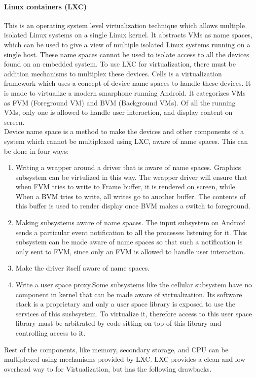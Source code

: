 \documentclass[seminar,twoside]{iitbreport}
\begin{document}
  \paragraph{Linux containers (LXC)}
  This is an operating system level virtualization technique which allows multiple isolated Linux systems on a single Linux kernel. It abstracts VMs as name spaces, which
  can be used to give a view of multiple isolated Linux systems running on a single host. These name spaces cannot be used to isolate access to all the devices found on an embedded system. To
  use LXC for virtualization, there must be addition mechanisms to multiplex these devices. Cells\cite{Andrus:2011:CVM:2043556.2043574} is a virtualization framework
  which uses a concept of device name spaces to handle these devices. It is made to virtualize a modern smarphone running Android. It categorizes VMs as FVM (Foreground VM) and BVM (Background VMs).
  Of all the running VMs, only one is allowed to handle user interaction, and display content on screen.
  \\Device name space is a method to make the devices and other components of a system which cannot be multiplexed using LXC, aware of name spaces. This can be done in four ways:
  \begin{enumerate}
  \renewcommand{\labelenumi}{(\roman{enumi})}
   \item Writing a wrapper around a driver that is aware of name spaces. Graphics subsystem can be virtulized in this way. The wrapper driver will ensure
   that when FVM tries to write to Frame buffer, it is rendered on screen, while When a BVM  tries to write, all writes go to another buffer. The contents of this buffer
   is used to render display once BVM makes a switch to foreground.
   \item Making subsystems aware of name spaces. The input subsystem on Android sends a particular event notification to all the processes listening for it. This subsystem
   can be made aware of name spaces so that such a notification is only sent to FVM, since only an FVM is allowed to handle user interaction.
   \item Make the driver itself aware of name spaces.
   \item Write a user space proxy.Some subsystems like the cellular subsystem have no component in kernel that can be made aware of virtualization. Its software stack is
   a proprietary and only a user space library is exposed to use the services of this susbsystem. To virtualize it, therefore access to this user space library must be
   arbitrated by code sitting on top of this library and controlling access to it.
  \end{enumerate}
Rest of the components, like memory, secondary storage, and CPU can be multiplexed using mechanisms provided by LXC.
LXC provides a clean and low overhead way to for Virtualization, but has the following drawbacks.
  
\end{document}
